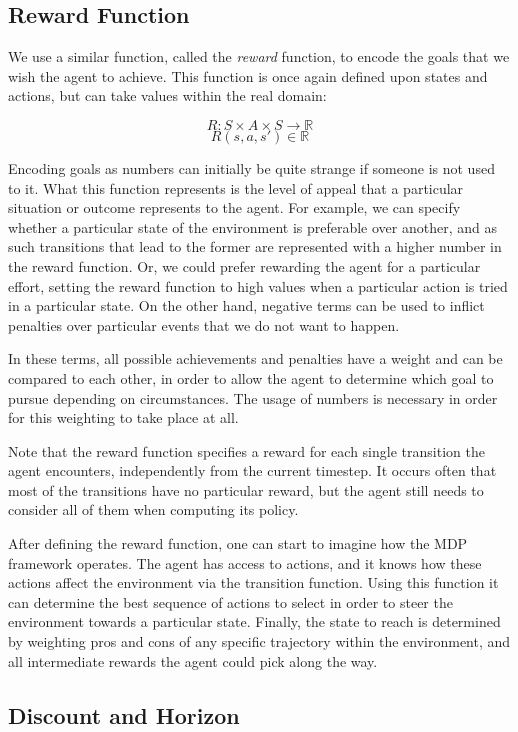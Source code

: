 \subsection{Reward Function}

We use a similar function, called the \textit{reward} function, to encode the goals that we wish the
agent to achieve. This function is once again defined upon states and actions, but can take values
within the real domain:

\[ R: S\times A\times S \rightarrow \mathbb{R} \]
\[ R(s, a, s') \in \mathbb{R} \]

Encoding goals as numbers can initially be quite strange if someone is not used to it. What this
function represents is the level of appeal that a particular situation or outcome represents to the
agent. For example, we can specify whether a particular state of the environment is preferable over
another, and as such transitions that lead to the former are represented with a higher number in
the reward function. Or, we could prefer rewarding the agent for a particular effort, setting the
reward function to high values when a particular action is tried in a particular state. On the other
hand, negative terms can be used to inflict penalties over particular events that we do not want to
happen.

In these terms, all possible achievements and penalties have a weight and can be compared to each
other, in order to allow the agent to determine which goal to pursue depending on circumstances. The
usage of numbers is necessary in order for this weighting to take place at all.

Note that the reward function specifies a reward for each single transition the agent encounters,
independently from the current timestep. It occurs often that most of the transitions have no
particular reward, but the agent still needs to consider all of them when computing its policy.

After defining the reward function, one can start to imagine how the MDP framework operates. The
agent has access to actions, and it knows how these actions affect the environment via the
transition function. Using this function it can determine the best sequence of actions to select in
order to steer the environment towards a particular state. Finally, the state to reach is determined
by weighting pros and cons of any specific trajectory within the environment, and all intermediate
rewards the agent could pick along the way.

\subsection{Discount and Horizon}

